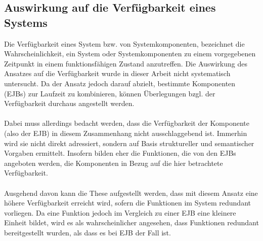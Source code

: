 \subsection{Auswirkung auf die Verfügbarkeit eines Systems}\label{sec_stabliliy}
Die Verfügbarkeit eines System bzw. von Systemkomponenten, bezeichnet die Wahrscheinlichkeit, ein System oder Systemkomponenten zu einem vorgegebenen Zeitpunkt in einem funktionsfähigen Zustand anzutreffen. \cite{it-admin}
Die Auswirkung des Ansatzes auf die Verfügbarkeit wurde in dieser Arbeit nicht systematisch untersucht. Da der Ansatz jedoch darauf abzielt, bestimmte Komponenten (EJBs) zur Laufzeit zu kombinieren, können Überlegungen bzgl. der Verfügbarkeit durchaus angestellt werden.
\\\\
Dabei muss allerdings bedacht werden, dass die Verfügbarkeit der Komponente (also der EJB) in diesem Zusammenhang nicht ausschlaggebend ist. Immerhin wird sie nicht direkt adressiert, sondern auf Basis struktureller und semantischer Vorgaben ermittelt. Insofern bilden eher die Funktionen, die von den EJBs angeboten werden, die Komponenten in Bezug auf die hier betrachtete Verfügbarkeit.
\\\\
Ausgehend davon kann die These aufgestellt werden, dass mit diesem Ansatz eine höhere Verfügbarkeit erreicht wird, sofern die Funktionen im System redundant vorliegen. Da eine Funktion jedoch im Vergleich zu einer EJB eine kleinere Einheit bildet, wird es als wahrscheinlicher angesehen, dass Funktionen redundant bereitgestellt wurden, als dass es bei EJB der Fall ist.
